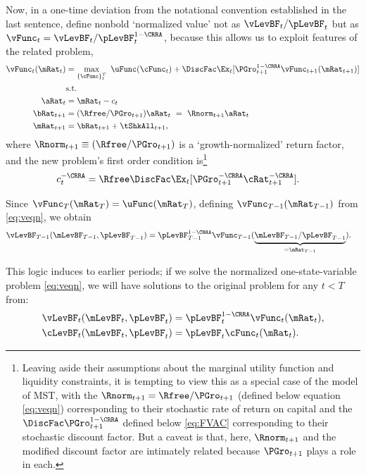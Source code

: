 \documentclass[BufferStockTheory]{subfiles}
\begin{document}
\hypertarget{The-Related-Problem}{}
Now, in a one-time deviation from the notational convention established in the last sentence, define nonbold `normalized value' not as $\vLevBF_{t}/\pLevBF_{t}$ but as $\vFunc_{t} = \vLevBF_{t}/\pLevBF_{t}^{1-\CRRA}$, because this allows us to exploit features of the related problem,
\begin{align}
  \vFunc_{t}(\mRat_{t})  & = \max_{\{\cFunc\}_{t}^{T}}~  \uFunc(\cFunc_{t}) +\DiscFac \Ex_{t}[\PGro_{t+1}^{1-\CRRA}\vFunc_{t+1}({\mRat}_{t+1})] \notag \\
                         & \mbox{s.t.}  \label{eq:veqn} 
  \\ {\aRat}_{t}  & = \mRat_{t}-c_{t}  \notag
  \\ {\bRat}_{t+1}  & = (\Rfree/\PGro_{t+1})\aRat_{t}  ~ = ~ \Rnorm_{t+1}\aRat_{t}  \notag
  \\ \mRat_{t+1}  & = \bRat_{t+1}+\tShkAll_{t+1}  \notag, %
\end{align}
where $\Rnorm_{t+1}\equiv (\Rfree/\PGro_{t+1})$ is a `growth-normalized' return factor, and the new problem's first order condition is\footnote{Leaving aside their assumptions about the marginal utility function and liquidity constraints, it is tempting to view this as a special case of the model of MST, with the $\Rnorm_{t+1}=\Rfree/\PGro_{t+1}$ (defined below equation \eqref{eq:veqn}) corresponding to their stochastic rate of return on capital and the {\FVAF} $\DiscFac \PGro_{t+1}^{1-\CRRA}$ defined below \eqref{eq:FVAC} corresponding to their stochastic discount factor.  But a caveat is that, here, $\Rnorm_{t+1}$ and the modified discount factor are intimately related because $\PGro_{t+1}$ plays a role in each.}
\begin{align}
  c_{t}^{-\CRRA}  & = \Rfree \DiscFac \Ex_{t}[ {\PGro}_{t+1}^{-\CRRA} {\cRat}
                    _{t+1}^{-\CRRA}].  \label{eq:scaledeuler}
\end{align}

Since $\vFunc_{T}(\mRat_{T}) = \uFunc(\mRat_{T})$, defining $\vFunc_{T-1}(\mRat_{T-1})$ from \eqref{eq:veqn}, we obtain
\begin{align*}
  \vLevBF_{T-1}(\mLevBF_{T-1},\pLevBF_{T-1})  & = \pLevBF_{T-1}^{1-\CRRA} \vFunc_{T-1}(\underbrace{\mLevBF_{T-1}/\pLevBF_{T-1}}_{=\mRat_{T-1}}).
\end{align*}

This logic induces to earlier periods; if we solve the
normalized one-state-variable problem \eqref{eq:veqn}, we
will have solutions to the original problem for any $t<T$
from:
\begin{align*}
  \vLevBF_{t}(\mLevBF_{t},\pLevBF_{t})  & = \pLevBF_{t}^{1-\CRRA}\vFunc_{t}(\mRat_{t}),
  \\ \cLevBF_{t}(\mLevBF_{t},\pLevBF_{t})  & = \pLevBF_{t}\cFunc_{t}(\mRat_{t}).
\end{align*}
\end{document}
